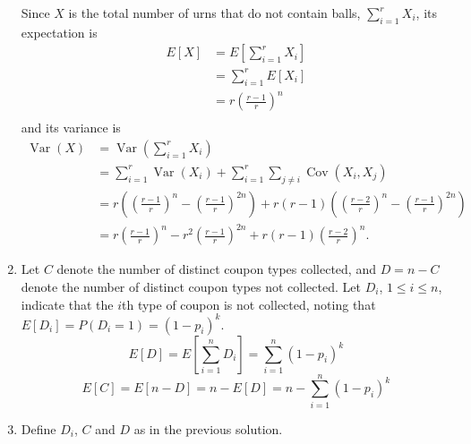\documentclass{article}
\DeclareMathOperator{\Cov}{Cov}
\DeclareMathOperator{\Var}{Var}
\begin{document}
\begin{enumerate}
    Since $X$ is the total number of urns that do not contain balls, $\sum_{i=1}^r X_i$, its expectation is
    \[\begin{split}
    E[X] & = E\left[\sum_{i=1}^r X_i\right] \\
         & = \sum_{i=1}^r E[X_i] \\
         & = r \left(\frac{r-1}{r}\right)^n \\
    \end{split}\]
    and its variance is
    \[\begin{split}
    \Var(X) & = \Var\left(\sum_{i=1}^{r} X_i\right) \\
            & = \sum_{i=1}^{r} \Var(X_i) + \sum_{i=1}^{r}\sum_{j \neq i}\Cov(X_i, X_j) \\
            & = r\left(\left(\frac{r-1}{r}\right)^n - \left(\frac{r-1}{r}\right)^{2n}\right) + r(r-1)\left(\left(\frac{r-2}{r}\right)^n - \left(\frac{r-1}{r}\right)^{2n}\right) \\
            & = r\left(\frac{r-1}{r}\right)^n - r^2\left(\frac{r-1}{r}\right)^{2n} + r(r-1)\left(\frac{r-2}{r}\right)^n.
    \end{split}\]
\item
    Let $C$ denote the number of distinct coupon types collected, and $D=n-C$ denote the number of distinct coupon types not collected.
    Let $D_i$, $1 \leq i \leq n$, indicate that the $i$th type of coupon is not collected, noting that $E[D_i] = P(D_i = 1) = (1-p_i)^k$.
    \[
    E[D] = E\left[\sum_{i=1}^{n}D_i\right] = \sum_{i=1}^{n}(1 - p_i)^k
    \]
    \[
    E[C] = E[ n - D ] = n - E[ D ] = n - \sum_{i=1}^{n}( 1- p_i )^k
    \]
\item
    Define $D_i$, $C$ and $D$ as in the previous solution.


\end{enumerate}
\end{document}
